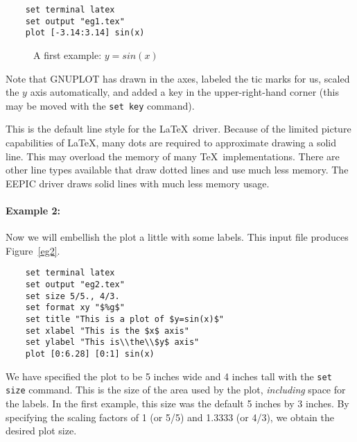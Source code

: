 \singlespace
\begin{verbatim}
    set terminal latex
    set output "eg1.tex"
    plot [-3.14:3.14] sin(x)
\end{verbatim}
\currentspace

\begin{figure}[htbp]
  \begin{center}
    
  \end{center}
  \caption{A first example: $y=sin(x)$} 
  \label{eg1}
\end{figure}

Note that GNUPLOT has drawn in the axes, labeled the tic marks for us,
scaled the $y$ axis automatically, and added a key in the
upper-right-hand corner (this may be moved with the {\tt set key}
command).

This is the default line style for the \LaTeX\ driver.  Because of the
limited picture capabilities of \LaTeX, many dots are required to
approximate drawing a solid line. This may overload the memory of many
\TeX\ implementations. There are other line types available that draw
dotted lines and use much less memory. The EEPIC driver draws solid
lines with much less memory usage.

\paragraph{Example 2:} Now we will embellish the plot a little with
some labels.  This input file produces Figure~\ref{eg2}.

\singlespace
\begin{verbatim}
    set terminal latex
    set output "eg2.tex"
    set size 5/5., 4/3.
    set format xy "$%g$"
    set title "This is a plot of $y=sin(x)$"
    set xlabel "This is the $x$ axis"
    set ylabel "This is\\the\\$y$ axis"
    plot [0:6.28] [0:1] sin(x)
\end{verbatim}
\currentspace


We have specified the plot to be 5 inches wide and 4 inches tall with
the {\tt set size} command. This is the size of the area used by the
plot, {\em including} space for the labels.  In the first example,
this size was the default 5 inches by 3 inches. By specifying the
scaling factors of 1 (or 5/5) and 1.3333 (or 4/3), we obtain the
desired plot size. 

